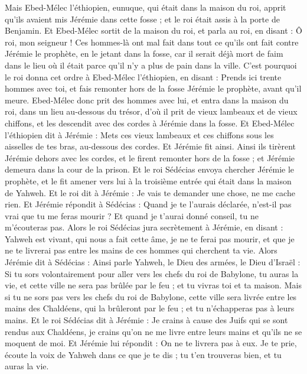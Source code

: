 \begin{multicols}{2}
Mais Ebed-Mélec l'éthiopien, eunuque, qui était dans la maison du roi, apprit qu'ils avaient mis Jérémie dans cette fosse ; et le roi était assis à la porte de Benjamin.
Et Ebed-Mélec sortit de la maison du roi, et parla au roi, en disant :
Ô roi, mon seigneur ! Ces hommes-là ont mal fait dans tout ce qu'ils ont fait contre Jérémie le prophète, en le jetant dans la fosse, car il serait déjà mort de faim dans le lieu où il était parce qu'il n'y a plus de pain dans la ville.
C'est pourquoi le roi donna cet ordre à Ebed-Mélec l'éthiopien, en disant : Prends ici trente hommes avec toi, et fais remonter hors de la fosse Jérémie le prophète, avant qu'il meure.
Ebed-Mélec donc prit des hommes avec lui, et entra dans la maison du roi, dans un lieu au-dessous du trésor, d'où il prit de vieux lambeaux et de vieux chiffons, et les descendit avec des cordes à Jérémie dans la fosse.
Et Ebed-Mélec l'éthiopien dit à Jérémie : Mets ces vieux lambeaux et ces chiffons sous les aisselles de tes bras, au-dessous des cordes. Et Jérémie fit ainsi.
Ainsi ils tirèrent Jérémie dehors avec les cordes, et le firent remonter hors de la fosse ; et Jérémie demeura dans la cour de la prison.
Et le roi Sédécias envoya chercher Jérémie le prophète, et le fit amener vers lui à la troisième entrée qui était dans la maison de Yahweh. Et le roi dit à Jérémie : Je vais te demander une chose, ne me cache rien.
Et Jérémie répondit à Sédécias : Quand je te l'aurais déclarée, n'est-il pas vrai que tu me feras mourir ? Et quand je t'aurai donné conseil, tu ne m'écouteras pas.
Alors le roi Sédécias jura secrètement à Jérémie, en disant : Yahweh est vivant, qui nous a fait cette âme, je ne te ferai pas mourir, et que je ne te livrerai pas entre les mains de ces hommes qui cherchent ta vie.
Alors Jérémie dit à Sédécias : Ainsi parle Yahweh, le Dieu des armées, le Dieu d'Israël : Si tu sors volontairement pour aller vers les chefs du roi de Babylone, tu auras la vie, et cette ville ne sera pas brûlée par le feu ; et tu vivras toi et ta maison.
Mais si tu ne sors pas vers les chefs du roi de Babylone, cette ville sera livrée entre les mains des Chaldéens, qui la brûleront par le feu ; et tu n'échapperas pas à leurs mains.
Et le roi Sédécias dit à Jérémie : Je crains à cause des Juifs qui se sont rendus aux Chaldéens, je crains qu'on ne me livre entre leurs mains et qu’ils ne se moquent de moi.
Et Jérémie lui répondit : On ne te livrera pas à eux. Je te prie, écoute la voix de Yahweh dans ce que je te dis ; tu t'en trouveras bien, et tu auras la vie.

\end{multicols}
